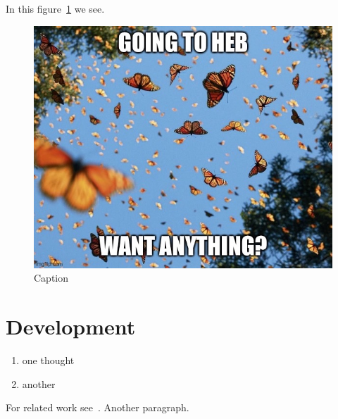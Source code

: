 \documentclass{article} %
\begin{document}
In this figure~\ref{fig:butterfly} we see.

\begin{figure}[ht] 
    \centering
\includegraphics[scale=.55]{butterfly}
    \caption{Caption}
    \label{fig:butterfly}
\end{figure}

\section{Development}
\label{sec:dev}

\begin{enumerate}
    \item one thought
    \item another
\end{enumerate}

For related work see~\cite{Victor:otherbook}.
Another paragraph.

%
\end{document}

